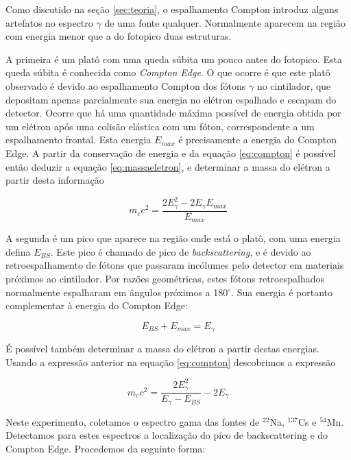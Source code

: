 \documentclass[a4paper, 11pt, notitlepage]{article}
\numberwithin{equation}{section}  %
\begin{document}
Como discutido na seção \ref{sec:teoria}, o espalhamento Compton introduz alguns artefatos no espectro $\gamma$ de uma fonte qualquer. Normalmente aparecem na região com energia menor que a do fotopico duas estruturas. 

A primeira é um platô com uma queda súbita um pouco antes do fotopico. Esta queda súbita é conhecida como \textit{Compton Edge}. O que ocorre é que este platô observado é devido ao espalhamento Compton dos fótons $\gamma$ no cintilador, que depositam apenas parcialmente sua energia no elétron espalhado e escapam do detector. Ocorre que há uma quantidade máxima possível de energia obtida por um elétron após uma colisão elástica com um fóton, correspondente a um espalhamento frontal. Esta energia $E_{max}$ é precisamente a energia do Compton Edge. A partir da conservação de energia e da equação \eqref{eq:compton} é possível então deduzir a equação \eqref{eq:massaeletron}, e determinar a massa do elétron a partir desta informação

\begin{equation*}
 m_e c^2 = \frac{2E_{\gamma}^{2} - 2E_{\gamma}E_{max}}{E_{max}}
\end{equation*}

A segunda é um pico que aparece na região onde está o platô, com uma energia defina $E_{BS}$. Este pico é chamado de pico de \textit{backscattering}, e é devido ao retroespalhamento de fótons que passaram incólumes pelo detector em materiais próximos ao cintilador. Por razões geométricas, estes fótons retroespalhados normalmente espalharam em ângulos próximos a 180$^\circ$. Sua energia é portanto complementar à energia do Compton Edge:

\begin{equation}
  E_{BS} + E_{max} = E_{\gamma}  \label{eq:cons.energia.compton}
\end{equation}

É possível também determinar a massa do elétron a partir destas energias. Usando a expressão anterior na equação \eqref{eq:compton} descobrimos a expressão

\begin{equation}
  m_e c^2 = \frac{2E_\gamma^2}{E_\gamma - E_{BS}} - 2 E_\gamma
  \label{eq:massaeletron.bs}
\end{equation}


Neste experimento, coletamos o espectro gama das fontes de ${}^{22}$Na, ${}^{137}$Cs e ${}^{54}$Mn. Detectamos para estes espectros a localização do pico de backscattering e do Compton Edge. Procedemos da seguinte forma:
\end{document}
